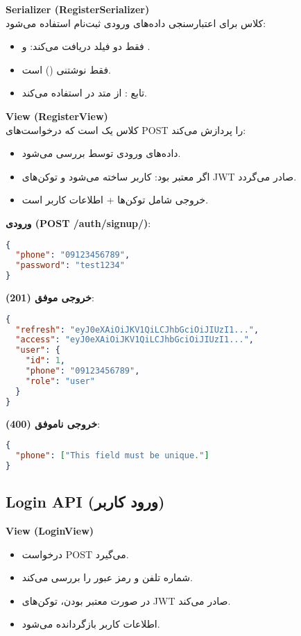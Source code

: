 \documentclass{report}
\begin{document}
\textbf{Serializer (RegisterSerializer)} \\
کلاس  برای اعتبارسنجی داده‌های ورودی ثبت‌نام استفاده می‌شود:
\begin{itemize}
  \item فقط دو فیلد دریافت می‌کند:  و .
  \item {} فقط نوشتنی () است.
  \item تابع : از متد  در  استفاده می‌کند.
\end{itemize}

\textbf{View (RegisterView)} \\
کلاس  یک  است که درخواست‌های POST را پردازش می‌کند:
\begin{itemize}
  \item داده‌های ورودی توسط  بررسی می‌شود.
  \item اگر معتبر بود: کاربر ساخته می‌شود و توکن‌های JWT صادر می‌گردد.
  \item خروجی شامل توکن‌ها + اطلاعات کاربر است.
\end{itemize}

\textbf{ورودی (POST /auth/signup/)}:
\begin{lstlisting}[language=json]
{
  "phone": "09123456789",
  "password": "test1234"
}
\end{lstlisting}

\textbf{خروجی موفق (201)}:
\begin{lstlisting}[language=json]
{
  "refresh": "eyJ0eXAiOiJKV1QiLCJhbGciOiJIUzI1...",
  "access": "eyJ0eXAiOiJKV1QiLCJhbGciOiJIUzI1...",
  "user": {
    "id": 1,
    "phone": "09123456789",
    "role": "user"
  }
}
\end{lstlisting}

\textbf{خروجی ناموفق (400)}:
\begin{lstlisting}[language=json]
{
  "phone": ["This field must be unique."]
}
\end{lstlisting}


\subsection{Login API (ورود کاربر)}
\textbf{View (LoginView)} \\
\begin{itemize}
  \item درخواست POST می‌گیرد.
  \item شماره تلفن و رمز عبور را بررسی می‌کند.
  \item در صورت معتبر بودن، توکن‌های JWT صادر می‌کند.
  \item اطلاعات کاربر بازگردانده می‌شود.
\end{itemize}
\end{document}
